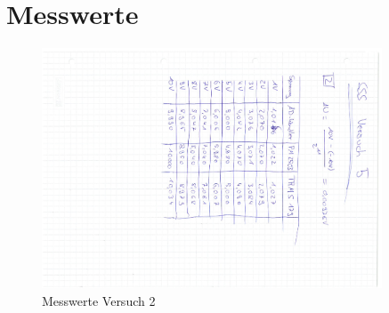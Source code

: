 \documentclass[12pt, oneside, a4paper, \docLanguage]{report}
\begin{document}
\section{Messwerte}
\label{chap:VERSUCH_2_MESSWERTE}
\begin{normalsize}
\begin{figure}[H]
	\centering
	\includegraphics[angle=90,width=0.9\textwidth]{../Messdaten2.pdf}
	\caption{Messwerte Versuch 2}
\end{figure}
\end{normalsize}
\end{document}
